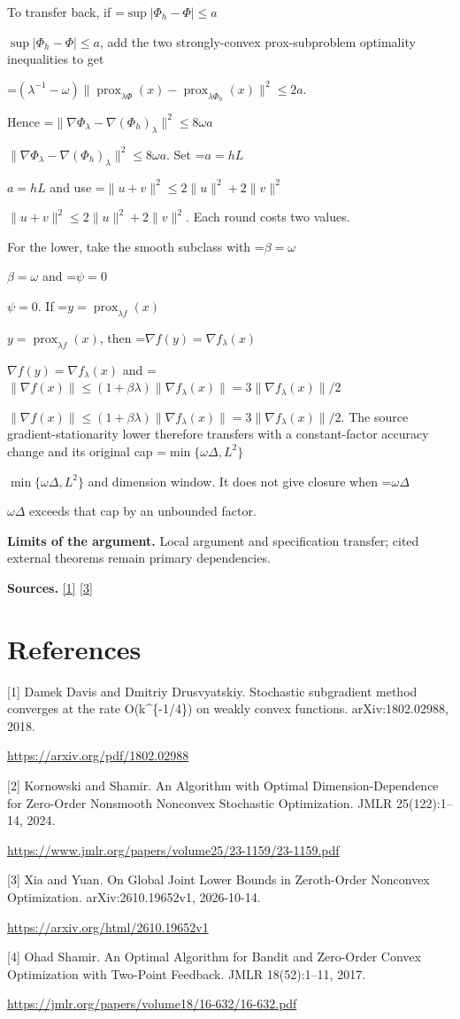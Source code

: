 \documentclass[10pt,a4paper]{article}
\newcommand{\AtlasMath}[1]{\par\begingroup\centering\setbox0=\hbox{$\displaystyle #1$}\ifdim\wd0>1.4\linewidth\typeout{ATLAS WIDE FORMULA: \the\wd0}\fi\ifdim\wd0>\linewidth\resizebox{\linewidth}{!}{\box0}\else\box0\fi\par\endgroup}
\newcommand{\AtlasInlineMath}[1]{\begingroup\setbox0=\hbox{$#1$}\ifdim\wd0>.4\linewidth\endgroup\AtlasMath{#1}\else\endgroup$#1$\fi}
\begin{document}
To transfer back, if \AtlasInlineMath{\sup|\Phi_h-\Phi|\le a}, add the two strongly-convex prox-subproblem optimality inequalities to get

\AtlasMath{(\lambda^{-1}-\omega)\|\operatorname{prox}_{\lambda\Phi}(x)-\operatorname{prox}_{\lambda\Phi_h}(x)\|^2\le2a.}

Hence \AtlasInlineMath{\|\nabla\Phi_\lambda-\nabla(\Phi_h)_\lambda\|^2\le8\omega a}. Set \AtlasInlineMath{a=hL} and use \AtlasInlineMath{\|u+v\|^2\le2\|u\|^2+2\|v\|^2}. Each round costs two values.

For the lower, take the smooth subclass with \AtlasInlineMath{\beta=\omega} and \AtlasInlineMath{\psi=0}. If \AtlasInlineMath{y=\operatorname{prox}_{\lambda f}(x)}, then \AtlasInlineMath{\nabla f(y)=\nabla f_\lambda(x)} and \AtlasInlineMath{\|\nabla f(x)\|\le(1+\beta\lambda)\|\nabla f_\lambda(x)\|=3\|\nabla f_\lambda(x)\|/2}. The source gradient-stationarity lower therefore transfers with a constant-factor accuracy change and its original cap \AtlasInlineMath{\min\{\omega\Delta,L^2\}} and dimension window. It does not give closure when \AtlasInlineMath{\omega\Delta} exceeds that cap by an unbounded factor.

\textbf{Limits of the argument.} Local argument and specification transfer; cited external theorems remain primary dependencies.

\textbf{Sources.} \href{https://arxiv.org/pdf/1802.02988}{[1]} \href{https://arxiv.org/html/2610.19652v1}{[3]}

\section{References}
[1] Damek Davis and Dmitriy Drusvyatskiy. Stochastic subgradient method converges at the rate O(k\textasciicircum{}\{-1/4\}) on weakly convex functions. arXiv:1802.02988, 2018.

\url{https://arxiv.org/pdf/1802.02988}

[2] Kornowski and Shamir. An Algorithm with Optimal Dimension-Dependence for Zero-Order Nonsmooth Nonconvex Stochastic Optimization. JMLR 25(122):1--14, 2024.

\url{https://www.jmlr.org/papers/volume25/23-1159/23-1159.pdf}

[3] Xia and Yuan. On Global Joint Lower Bounds in Zeroth-Order Nonconvex Optimization. arXiv:2610.19652v1, 2026-10-14.

\url{https://arxiv.org/html/2610.19652v1}

[4] Ohad Shamir. An Optimal Algorithm for Bandit and Zero-Order Convex Optimization with Two-Point Feedback. JMLR 18(52):1--11, 2017.

\url{https://jmlr.org/papers/volume18/16-632/16-632.pdf}
\end{document}

